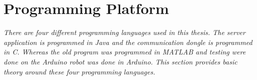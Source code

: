 \section{Programming Platform}
\label{sec:tProgrammingPlatform}
\textit{There are four different programming languages used in this thesis. The server application is programmed in Java and the communication dongle is programmed in C. Whereas the old program was programmed in MATLAB and testing were done on the Arduino robot was done in Arduino. This section provides basic theory around these four programming languages.}



